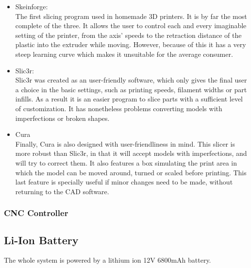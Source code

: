 			\begin{itemize}
			  
			  \item Skeinforge: \hfill \\
			  The first slicing program used in homemade 3D printers. It is by far the most complete of the three. It allows the user to control each and every imaginable setting of the printer, from the axis' speeds to the retraction distance of the plastic into the extruder while moving. However, because of this it has a very steep learning curve which makes it unsuitable for the average consumer.

			  \item Slic3r:  \hfill \\
			  Slic3r was created as an user-friendly software, which only gives the final user a choice in the basic settings, such as printing speeds, filament widths or part infills. As a result it is an easier program to slice parts with a sufficient level of customization. It has nonetheless problems converting models with imperfections or broken shapes.
			  
			  \item Cura \hfill \\
			  Finally, Cura is also designed with user-friendliness in mind. This slicer is more robust than Slic3r, in that it will accept models with imperfections, and will try to correct them. It also features a box simulating the print area in which the model can be moved around, turned or scaled before printing.
			  This last feature is specially useful if minor changes need to be made, without returning to the CAD software.
			
			\end{itemize}



		\subsubsection{CNC Controller}


\subsection{Li-Ion Battery}

	The whole system is powered by a lithium ion 12V 6800mAh battery. 

